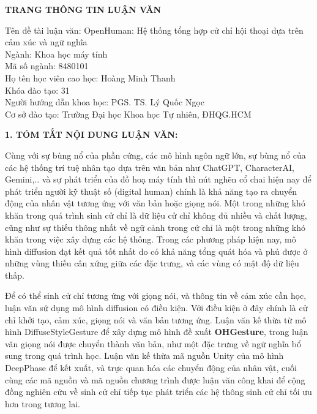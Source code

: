 {}
\begin{center}
{\centering \MakeUppercase \LARGE \fontsize{16.16}{19.26}\selectfont \bfseries TRANG THÔNG TIN LUẬN VĂN}
\end{center}
{
\setlength{\parindent}{0pt}
Tên đề tài luận văn: OpenHuman: Hệ thống tổng hợp cử chỉ hội thoại dựa trên cảm xúc và ngữ nghĩa \\
Ngành: Khoa học máy tính \\
Mã số ngành:  8480101 \\
Họ tên học viên cao học: Hoàng Minh Thanh \\
Khóa đào tạo: 31 \\
Người hướng dẫn khoa học: PGS. TS. Lý Quốc Ngọc \\
Cơ sở đào tạo: Trường Đại học Khoa học Tự nhiên, ĐHQG.HCM}

\vspace{10pt}
{\MakeUppercase \Large \bfseries 1. TÓM TẮT NỘI DUNG LUẬN VĂN:}

Cùng với sự bùng nổ của phần cứng, các mô hình ngôn ngữ lớn, sự bùng nổ của các hệ thống trí tuệ nhân tạo dựa trên văn bản như ChatGPT, CharacterAI, Gemini,..  và sự phát triển của đồ hoạ máy tính thì nút nghẽn cổ chai hiện nay để phát triển người kỹ thuật số (digital human) chính là khả năng tạo ra chuyển động của nhân vật tương ứng với văn bản hoặc giọng nói.
Một trong những khó khăn trong quá trình sinh cử chỉ là dữ liệu cử chỉ không đủ nhiều và chất lượng, cũng như sự thiếu thông nhất về ngữ cảnh trong cử chỉ là một trong những khó khăn trong việc xây dựng các hệ thống. Trong các phương pháp hiện nay,  mô hình diffusion đạt kết quả tốt nhất do có khả năng tổng quát hóa và phủ được ở những vùng thiếu cân xứng giữa các đặc trưng, và các vùng có mật độ dữ liệu thấp.

 Để có thể sinh cử chỉ tương ứng với giọng nói, và thông tin về cảm xúc cần học, luận văn sử dụng mô hình diffusion có điều kiện. Với điều kiện ở đây chính là cử chỉ khởi tạo, cảm xúc, giọng nói và văn bản tương ứng.
Luận văn kế thừa từ mô hình DiffuseStyleGesture để xây dựng mô hình đề xuất \textbf{OHGesture}, trong luận văn giọng nói được chuyển thành văn bản, như một đặc trưng về ngữ nghĩa bổ sung trong quá trình học. Luận văn kế thừa mã nguồn Unity của mô hình DeepPhase để kết xuất, và trực quan hóa các chuyển động của nhân vật, cuối cùng các mã nguồn và mã nguồn chương trình được luận văn công khai để cộng đồng nghiên cứu về sinh cử chỉ tiếp tục phát triển các hệ thông sinh cử chỉ tối ưu hơn trong tương lai. 

